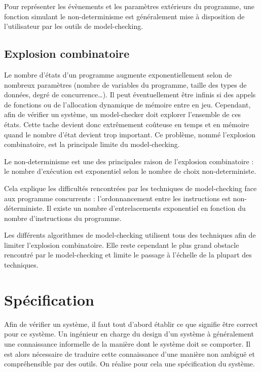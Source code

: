 Pour représenter les évènements et les paramètres extérieurs du programme,
une fonction simulant le non-determinisme est généralement mise à disposition
de l'utilisateur par les outils de model-checking.

\subsection{Explosion combinatoire}

Le nombre d'états d'un programme augmente exponentiellement selon de nombreux
paramètres (nombre de variables du programme, taille des types de données, degré
de concurrence\dots). Il peut éventuellement être infinis si des appels de
fonctions ou de l'allocation dynamique de mémoire entre en jeu. Cependant, afin
de vérifier un système, un model-checker doit explorer l'ensemble de ces états.
Cette tache devient donc extrêmement coûteuse en temps et en mémoire quand le
nombre d'état devient trop important.
Ce problème, nommé l'explosion combinatoire, est la principale limite du
model-checking.

Le non-determinisme est une des principales raison de l'explosion combinatoire :
le nombre d'exécution est exponentiel selon le nombre de choix non-deterministe.

Cela explique les difficultés rencontrées par les techniques de model-checking
face aux programme concurrents : l'ordonnancement entre les instructions est
non-déterministe. Il existe un nombre d'entrelacements exponentiel en fonction
du nombre d'instructions du programme.

Les différents algorithmes de model-checking utilisent tous des
techniques afin de limiter l'explosion combinatoire. Elle reste
cependant le plus grand obstacle rencontré par le model-checking et
limite le passage à l'échelle de la plupart des techniques.

\section{Spécification}\label{sec:specification}

Afin de vérifier un système, il faut tout d'abord établir ce que signifie être
correct pour ce système. Un ingénieur en charge du design d'un système à
généralement une connaissance informelle de la manière dont le système doit se
comporter. Il est alors nécessaire de traduire cette connaissance d'une manière
non ambiguë et compréhensible par des outils. On réalise pour cela une
spécification du système.

